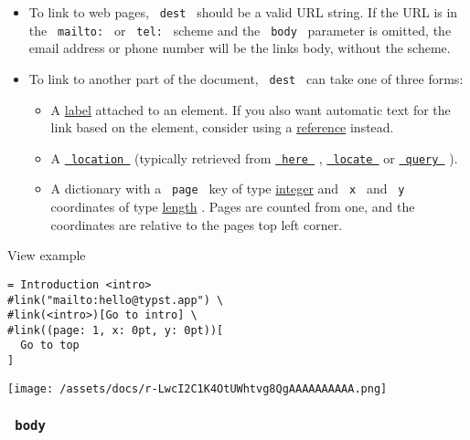 \begin{itemize}
\item
  To link to web pages, \texttt{\ dest\ } should be a valid URL string.
  If the URL is in the \texttt{\ mailto:\ } or \texttt{\ tel:\ } scheme
  and the \texttt{\ body\ } parameter is omitted, the email address or
  phone number will be the link\textquotesingle s body, without the
  scheme.
\item
  To link to another part of the document, \texttt{\ dest\ } can take
  one of three forms:

  \begin{itemize}
  \item
    A \href{/docs/reference/foundations/label/}{label} attached to an
    element. If you also want automatic text for the link based on the
    element, consider using a
    \href{/docs/reference/model/ref/}{reference} instead.
  \item
    A
    \href{/docs/reference/introspection/location/}{\texttt{\ location\ }}
    (typically retrieved from
    \href{/docs/reference/introspection/here/}{\texttt{\ here\ }} ,
    \href{/docs/reference/introspection/locate/}{\texttt{\ locate\ }} or
    \href{/docs/reference/introspection/query/}{\texttt{\ query\ }} ).
  \item
    A dictionary with a \texttt{\ page\ } key of type
    \href{/docs/reference/foundations/int/}{integer} and \texttt{\ x\ }
    and \texttt{\ y\ } coordinates of type
    \href{/docs/reference/layout/length/}{length} . Pages are counted
    from one, and the coordinates are relative to the
    page\textquotesingle s top left corner.
  \end{itemize}
\end{itemize}


View example

\begin{verbatim}
= Introduction <intro>
#link("mailto:hello@typst.app") \
#link(<intro>)[Go to intro] \
#link((page: 1, x: 0pt, y: 0pt))[
  Go to top
]
\end{verbatim}

\texttt{[image: /assets/docs/r-LwcI2C1K4OtUWhtvg8QgAAAAAAAAAA.png]}

\subsubsection{\texorpdfstring{\texttt{\ body\ }}{ body }}\label{parameters-body}

